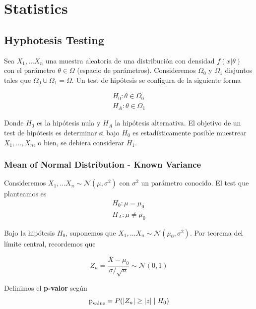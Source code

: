 \chapter{Statistics}

\section{Hyphotesis Testing}

Sea $X_1, \dots X_n$ una muestra aleatoria de una distribución con densidad $f(x|\theta)$ con el parámetro $\theta \in \Omega$ (espacio de parámetros). Consideremos $\Omega_0$ y $\Omega_1$ disjuntos tales que $\Omega_0 \cup \Omega_1 = \Omega$. Un test de hipótesis se configura de la siguiente forma 

\begin{equation*}
\begin{aligned}
    H_0: \theta \in \Omega_0 \\ 
    H_A: \theta \in \Omega_1
\end{aligned}
\end{equation*}

Donde $H_0$ es la hipótesis nula y $H_A$ la hipótesis alternativa. El objetivo de un test de hipótesis es determinar si bajo $H_0$ es estadísticamente posible muestrear $X_1 , \dots, X_n$, o bien, se debiera considerar $H_1$.

\subsection{Mean of Normal Distribution - Known Variance}

Consideremos $X_1 , \dots X_n \sim \mathcal{N}(\mu, \sigma^2)$ con $\sigma^2$ un parámetro conocido. El test que planteamos es 
\begin{equation*}
\begin{aligned}
    H_0: \mu = \mu_0 \\ 
    H_A: \mu \neq \mu_0
\end{aligned}
\end{equation*}

Bajo la hipótesis $H_0$, suponemos que $X_1, \dots X_n \sim \mathcal{N}(\mu_0, \sigma^2)$. Por teorema del límite central, recordemos que 

$$ 
Z_n = \frac{\overline{X} - \mu_0}{\sigma / \sqrt{n}} \sim \mathcal{N}(0,1)
$$

Definimos el \textbf{p-valor} según
$$
\text{p}_{\text{value}} = P(|Z_n| \geq |z| \hspace{0.1cm} |\hspace{0.1cm} H_0) 
$$

